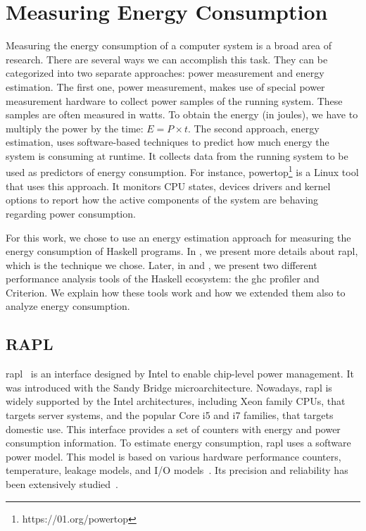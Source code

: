 \chapter{Measuring Energy Consumption}\label{chapter:tools}
Measuring the energy consumption of a computer system is a broad area of research. There are several ways we can accomplish this task. They can be categorized into two separate approaches: power measurement and energy estimation. The first one, power measurement, makes use of special power measurement hardware to collect power samples of the running system. These samples are often measured in watts. To obtain the energy (in joules), we have to multiply the power by the time: $E = P \times t$.
The second approach, energy estimation, uses software-based techniques to predict how much energy the system is consuming at runtime. It collects data from the running system to be used as predictors of energy consumption. For instance, powertop\footnote{https://01.org/powertop} is a Linux tool that uses this approach. It monitors CPU states, devices drivers and kernel options to report how the active components of the system are behaving regarding power consumption.

For this work, we chose to use an energy estimation approach for measuring the energy consumption of Haskell programs. In , we present more details about \acs{rapl}, which is the technique we chose. Later, in  and , we present two different performance analysis tools of the Haskell ecosystem: the \acs{ghc} profiler and Criterion. We explain how these tools work and how we extended them also to analyze energy consumption.

\section{RAPL}\label{sec:rapl}
\ac{rapl}~\citep{david:2010} is an interface designed by Intel to enable chip-level power management. It was introduced with the Sandy Bridge microarchitecture. Nowadays, \acs{rapl} is widely supported by the Intel architectures, including Xeon family CPUs, that targets server systems, and the popular Core i5 and i7 families, that targets domestic use. This interface provides a set of counters with energy and power consumption information. To estimate energy consumption, \acs{rapl} uses a software power model. This model is based on various hardware performance counters, temperature, leakage models, and I/O models~\citep{weaver:2012}. Its precision and reliability has been extensively studied~\citep{rotem:2012,hahnel:2012}.

